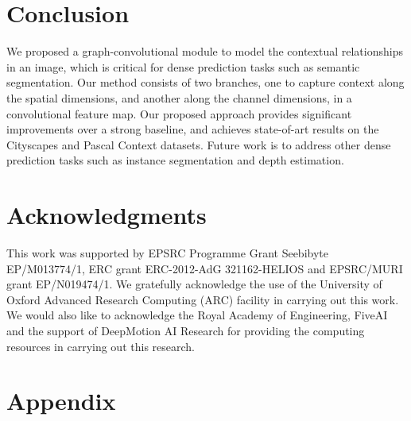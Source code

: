 \documentclass{bmvc2k}
\begin{document}
\begin{table}
\renewcommand\arraystretch{1.1}
\end{table}

 \section{Conclusion}

We proposed a graph-convolutional module to model the contextual relationships in an image, which is critical for dense prediction tasks such as semantic segmentation.
Our method consists of two branches, one to capture context along the spatial dimensions, and another along the channel dimensions, in a convolutional feature map.
Our proposed approach provides significant improvements over a strong baseline, and achieves state-of-art results on the Cityscapes and Pascal Context datasets.
Future work is to address other dense prediction tasks such as instance segmentation and depth estimation. \section*{Acknowledgments}
This work was supported by EPSRC Programme Grant Seebibyte EP/M013774/1, ERC grant ERC-2012-AdG 321162-HELIOS and EPSRC/MURI grant EP/N019474/1.
We gratefully acknowledge the use of the University of Oxford Advanced Research Computing (ARC) facility in carrying out this work.
We would also like to acknowledge the Royal Academy of Engineering, FiveAI and the support of DeepMotion AI Research for providing the computing resources in carrying out this research.     
\clearpage
\appendix

\section*{Appendix}
\label{sec:app}
\end{document}
